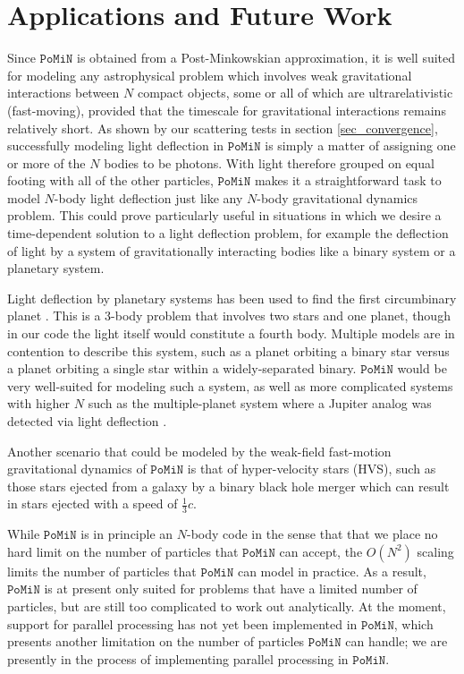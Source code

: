 \documentclass[aps,onecolumn,notitlepage,eqsecnum,nofootinbib,floatfix,superscriptaddress]{revtex4-1}
\newcommand{\codename}{\mathtt{PoMiN}}
\begin{document}
\section{Applications and Future Work}
Since $\codename$ is obtained from a Post-Minkowskian approximation, it is well suited for modeling any astrophysical problem which involves weak gravitational interactions between $N$ compact objects, some or all of which are ultrarelativistic (fast-moving), provided that the timescale for gravitational interactions remains relatively short. As shown by our scattering tests in section \ref{sec_convergence}, successfully modeling light deflection in $\codename$ is simply a matter of assigning one or more of the $N$ bodies to be photons.  With light therefore grouped on equal footing with all of the other particles, $\codename$ makes it a straightforward task to model $N$-body light deflection just like any $N$-body gravitational dynamics problem.  This could prove particularly useful in situations in which we desire a time-dependent solution to a light deflection problem, for example the deflection of light by a system of gravitationally interacting bodies like a binary system or a planetary system.  

Light deflection by planetary systems has been used to find the first circumbinary planet \cite{circumbinary_planet}.  This is a 3-body problem that involves two stars and one planet, though in our code the light itself would constitute a fourth body.  Multiple models are in contention to describe this system, such as a planet orbiting a binary star versus a planet orbiting a single star within a widely-separated binary.  $\codename$ would be very well-suited for modeling such a system, as well as more complicated systems with higher $N$ such as the multiple-planet system where a Jupiter analog was detected via light deflection \cite{Jupiter_microlensing}.

Another scenario that could be modeled by the weak-field fast-motion gravitational dynamics of $\codename$ is that of hyper-velocity stars (HVS), such as those stars ejected from a galaxy by a binary black hole merger which can result in stars ejected with a speed of $\frac{1}{3} c$.  \cite{Loeb1} \cite{Loeb2} 

While $\codename$ is in principle an $N$-body code in the sense that that we place no hard limit on the number of particles that $\codename$ can accept, the $O(N^2)$ scaling limits the number of particles that $\codename$ can model in practice. As a result, $\codename$ is at present only suited for problems that have a limited number of particles, but are still too complicated to work out analytically. At the moment, support for parallel processing has not yet been implemented in $\codename$, which presents another limitation on the number of particles $\codename$ can handle; we are presently in the process of implementing parallel processing in $\codename$. 
\end{document}
